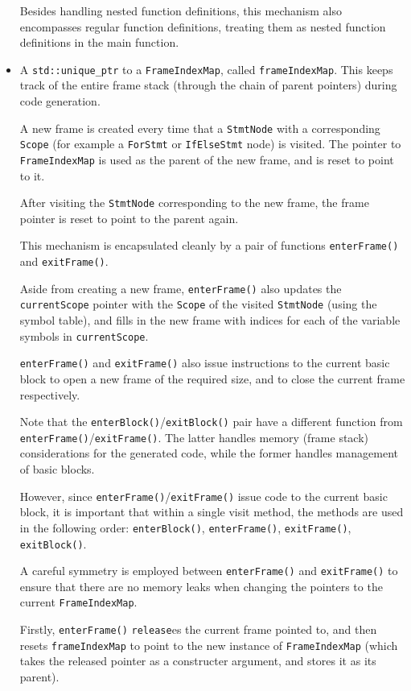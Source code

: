 \documentclass[11pt,a4paper]{scrartcl}
\begin{document}
\begin{itemize}
        Besides handling nested function definitions, this mechanism also encompasses regular function definitions, treating them as nested function definitions in the main function.

  \item A \verb|std::unique_ptr| to a \verb|FrameIndexMap|, called \verb|frameIndexMap|. This keeps track of the entire frame stack (through the chain of parent pointers) during code generation.

        A new frame is created every time that a \verb|StmtNode| with a corresponding \verb|Scope| (for example a \verb|ForStmt| or \verb|IfElseStmt| node) is visited. The pointer to \verb|FrameIndexMap| is used as the parent of the new frame, and is reset to point to it.

        After visiting the \verb|StmtNode| corresponding to the new frame, the frame pointer is reset to point to the parent again.

        This mechanism is encapsulated cleanly by a pair of functions \verb|enterFrame()| and \verb|exitFrame()|.

        Aside from creating a new frame, \verb|enterFrame()| also updates the \verb|currentScope| pointer with the \verb|Scope| of the visited \verb|StmtNode| (using the symbol table), and fills in the new frame with indices for each of the variable symbols in \verb|currentScope|.

        \verb|enterFrame()| and \verb|exitFrame()| also issue instructions to the current basic block to open a new frame of the required size, and to close the current frame respectively.

        Note that the \verb|enterBlock()|/\verb|exitBlock()| pair have a different function from \verb|enterFrame()|/\verb|exitFrame()|. The latter handles memory (frame stack) considerations for the generated code, while the former handles management of basic blocks.

        However, since \verb|enterFrame()|/\verb|exitFrame()| issue code to the current basic block, it is important that within a single visit method, the methods are used in the following order: \verb|enterBlock()|, \verb|enterFrame()|, \verb|exitFrame()|, \verb|exitBlock()|.

        A careful symmetry is employed between \verb|enterFrame()| and \verb|exitFrame()| to ensure that there are no memory leaks when changing the pointers to the current \verb|FrameIndexMap|.

        Firstly, \verb|enterFrame()| \verb|release|es the current frame pointed to, and then resets \verb|frameIndexMap| to point to the new instance of \verb|FrameIndexMap| (which takes the released pointer as a constructer argument, and stores it as its parent).


\end{itemize}
\end{document}
